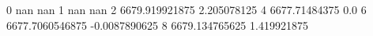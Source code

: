 0 nan nan
1 nan nan
2 6679.919921875 2.205078125
4 6677.71484375 0.0
6 6677.7060546875 -0.0087890625
8 6679.134765625 1.419921875

